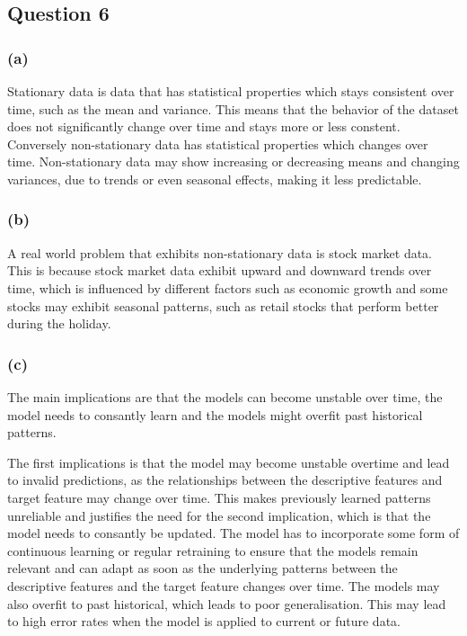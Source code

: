 \documentclass[10pt]{article}
\begin{document}
\subsection*{Question 6}

\subsubsection*{(a)}

Stationary data is data that has statistical properties which stays consistent over time, such as the mean and variance.
This means that the behavior of the dataset does not significantly change over time and stays more or less constent. Conversely
non-stationary data has statistical properties which changes over time. Non-stationary data may show increasing or decreasing
means and changing variances, due to trends or even seasonal effects, making it less predictable. 

\subsubsection*{(b)}

A real world problem that exhibits non-stationary data is stock market data. This is because stock market data
exhibit upward and downward trends over time, which is influenced by different factors such as economic growth
and some stocks may exhibit seasonal patterns, such as retail stocks that perform better during the holiday. 

\subsubsection*{(c)}

The main implications are that the models can become unstable over time, the model needs to consantly learn and
the models might overfit past historical patterns.

The first implications is that the model may become unstable overtime and lead to invalid predictions, as the
relationships between the descriptive features and target feature may change over time. This makes previously
learned patterns unreliable and justifies the need for the second implication, which is that the model
needs to consantly be updated. The model has to incorporate some form of continuous learning or regular retraining
to ensure that the models remain relevant and can adapt as soon as the underlying patterns
between the descriptive features and the target feature changes over time. The models may also overfit to
past historical, which leads to poor generalisation. This may lead to high error rates when the model is applied to
current or future data.
\end{document}

